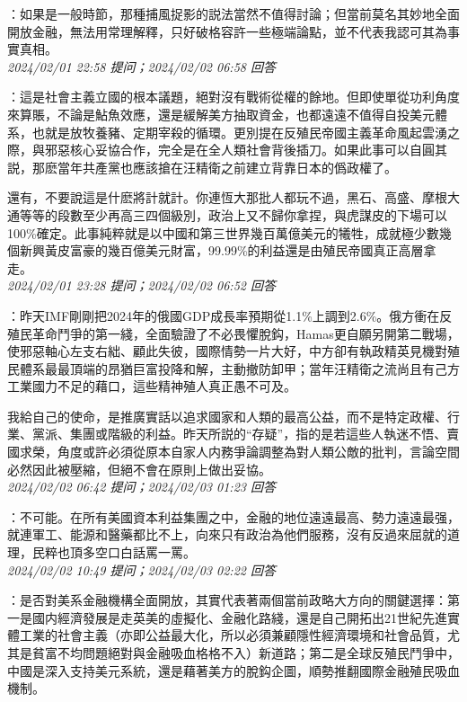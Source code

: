 \documentclass[twocolumn]{ctexart}
\begin{document}
：如果是一般時節，那種捕風捉影的説法當然不值得討論；但當前莫名其妙地全面開放金融，無法用常理解釋，只好破格容許一些極端論點，並不代表我認可其為事實真相。
\\

\textit{\hfill\noindent\small 2024/02/01 22:58 提问；2024/02/02 06:58 回答}

：這是社會主義立國的根本議題，絕對沒有戰術從權的餘地。但即使單從功利角度來算賬，不論是鮎魚效應，還是緩解美方抽取資金，也都遠遠不值得自投美元體系，也就是放牧養豬、定期宰殺的循環。更別提在反殖民帝國主義革命風起雲湧之際，與邪惡核心妥協合作，完全是在全人類社會背後插刀。如果此事可以自圓其説，那麽當年共產黨也應該搶在汪精衛之前建立背靠日本的僞政權了。


還有，不要說這是什麽將計就計。你連恆大那批人都玩不過，黑石、高盛、摩根大通等等的段數至少再高三四個級別，政治上又不歸你拿捏，與虎謀皮的下場可以100\%確定。此事純粹就是以中國和第三世界幾百萬億美元的犧牲，成就極少數幾個新興黃皮富豪的幾百億美元財富，99.99\%的利益還是由殖民帝國真正高層拿走。
\\

\textit{\hfill\noindent\small 2024/02/01 23:28 提问；2024/02/02 06:52 回答}

：昨天IMF剛剛把2024年的俄國GDP成長率預期從1.1\%上調到2.6\%。俄方衝在反殖民革命鬥爭的第一綫，全面驗證了不必畏懼脫鈎，Hamas更自願另開第二戰場，使邪惡軸心左支右絀、顧此失彼，國際情勢一片大好，中方卻有執政精英見機對殖民體系最最頂端的昂猶巨富投降和解，主動撤防卸甲；當年汪精衛之流尚且有己方工業國力不足的藉口，這些精神殖人真正愚不可及。

我給自己的使命，是推廣實話以追求國家和人類的最高公益，而不是特定政權、行業、黨派、集團或階級的利益。昨天所説的“存疑”，指的是若這些人執迷不悟、賣國求榮，角度或許必須從原本自家人内務爭論調整為對人類公敵的批判，言論空間必然因此被壓縮，但絕不會在原則上做出妥協。
\\

\textit{\hfill\noindent\small 2024/02/02 06:42 提问；2024/02/03 01:23 回答}

：不可能。在所有美國資本利益集團之中，金融的地位遠遠最高、勢力遠遠最强，就連軍工、能源和醫藥都比不上，向來只有政治為他們服務，沒有反過來屈就的道理，民粹也頂多空口白話罵一罵。
\\

\textit{\hfill\noindent\small 2024/02/02 10:49 提问；2024/02/03 02:22 回答}

：是否對美系金融機構全面開放，其實代表著兩個當前政略大方向的關鍵選擇：第一是國内經濟發展是走英美的虛擬化、金融化路綫，還是自己開拓出21世紀先進實體工業的社會主義（亦即公益最大化，所以必須兼顧隱性經濟環境和社會品質，尤其是貧富不均問題絕對與金融吸血格格不入）新道路；第二是全球反殖民鬥爭中，中國是深入支持美元系統，還是藉著美方的脫鈎企圖，順勢推翻國際金融殖民吸血機制。
\end{document}

